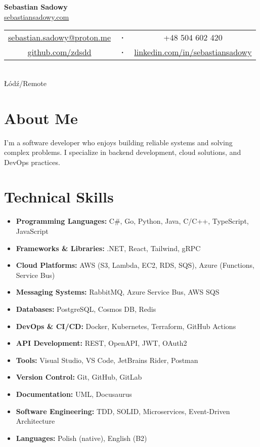 \documentclass[a4paper,10pt]{article}
\begin{document}
\begin{center}
    {\Huge\textbf{Sebastian Sadowy}} \\[0.3cm]
    \href{https://sebastiansadowy.com}{sebastiansadowy.com} \\[0.2cm]
    \begin{tabular}{c c c}
        \href{mailto:sebastian.sadowy@proton.me}{sebastian.sadowy@proton.me} & 
        \textbf{·} & 
        +48 504 602 420 \\
        \href{https://github.com/zdsdd}{github.com/zdsdd} &
        \textbf{·} &
        \href{https://www.linkedin.com/in/sebastiansadowy}{linkedin.com/in/sebastiansadowy}
    \end{tabular} \\
    Łódź/Remote
\end{center}

\section{About Me}
I'm a software developer who enjoys building reliable systems and solving complex problems. I specialize in backend development, cloud solutions, and DevOps practices.

\section{Technical Skills}
\begin{itemize}[leftmargin=0.5cm, itemsep=6pt, label=\textbullet]
    \item \textbf{Programming Languages:} C\#, Go, Python, Java, C/C++, TypeScript, JavaScript
    \item \textbf{Frameworks \& Libraries:} .NET, React, Tailwind, gRPC
    \item \textbf{Cloud Platforms:} AWS (S3, Lambda, EC2, RDS, SQS), Azure (Functions, Service Bus)
    \item \textbf{Messaging Systems:} RabbitMQ, Azure Service Bus, AWS SQS
    \item \textbf{Databases:} PostgreSQL, Cosmos DB, Redis
    \item \textbf{DevOps \& CI/CD:} Docker, Kubernetes, Terraform, GitHub Actions
    \item \textbf{API Development:} REST, OpenAPI, JWT, OAuth2
    \item \textbf{Tools:} Visual Studio, VS Code, JetBrains Rider, Postman
    \item \textbf{Version Control:} Git, GitHub, GitLab
    \item \textbf{Documentation:} UML, Docusaurus
    \item \textbf{Software Engineering:} TDD, SOLID, Microservices, Event-Driven Architecture
    \item \textbf{Languages:} Polish (native), English (B2)
\end{itemize}
\end{document}
